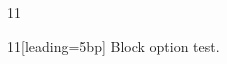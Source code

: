 \documentclass[paper=A4]{ropas-poster}
\begin{document}
\begin{postergrid}{1}{1}
\begin{posterblock}{1}{1}[leading=5bp]
Block option test.
\end{posterblock}
\end{postergrid}
\end{document}
